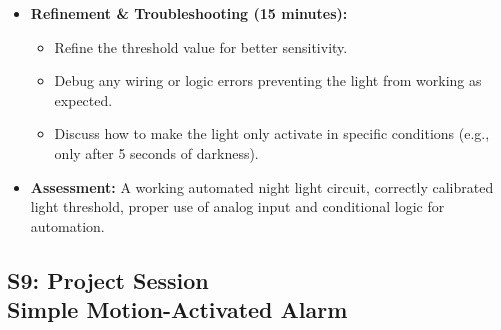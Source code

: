 {\begin{itemize}
        \item \textbf{Refinement \& Troubleshooting (15 minutes):}
        \begin{itemize}
            \item Refine the threshold value for better sensitivity.
            \item Debug any wiring or logic errors preventing the light from working as expected.
            \item Discuss how to make the light only activate in specific conditions (e.g., only after 5 seconds of darkness).
        \end{itemize}

        \item \textbf{Assessment:} A working automated night light circuit, correctly calibrated light threshold, proper use of analog input and conditional logic for automation.
    \end{itemize}
    }

\subsection{\texorpdfstring{S9: Project Session\\ Simple Motion-Activated Alarm}
                              {S9: Project Session Simple Motion-Activated Alarm}}

